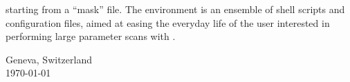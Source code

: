 \begin{titlepage}
starting from a \MADX{} ``mask'' file.
The \SIXDESK{} environment is an ensemble of shell scripts and configuration
files, aimed at easing the everyday life of the user interested in performing
large parameter scans with \SIXTRACK{}.
\vfill
\begin{center}
    Geneva, Switzerland \\
    \today
\end{center}

\end{titlepage}
